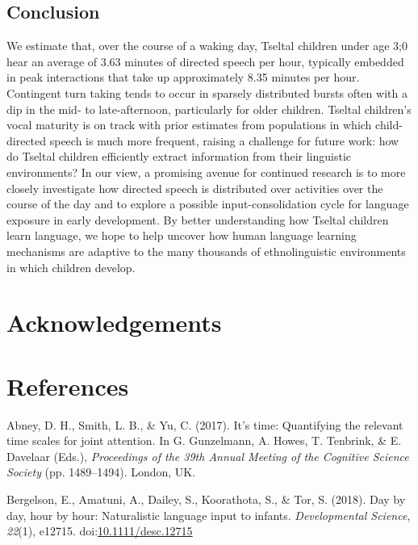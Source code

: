 \documentclass[floatsintext,man]{apa6}
\theoremstyle{definition}
\theoremstyle{definition}
\theoremstyle{definition}
\theoremstyle{remark}
\begin{document}
\subsection{Conclusion}\label{disc-conclusion}

We estimate that, over the course of a waking day, Tseltal children
under age 3;0 hear an average of 3.63 minutes of directed speech per
hour, typically embedded in peak interactions that take up approximately
8.35 minutes per hour. Contingent turn taking tends to occur in sparsely
distributed bursts often with a dip in the mid- to late-afternoon,
particularly for older children. Tseltal children's vocal maturity is on
track with prior estimates from populations in which child-directed
speech is much more frequent, raising a challenge for future work: how
do Tseltal children efficiently extract information from their
linguistic environments? In our view, a promising avenue for continued
research is to more closely investigate how directed speech is
distributed over activities over the course of the day and to explore a
possible input-consolidation cycle for language exposure in early
development. By better understanding how Tseltal children learn
language, we hope to help uncover how human language learning mechanisms
are adaptive to the many thousands of ethnolinguistic environments in
which children develop.

\section{Acknowledgements}\label{acknowledgements}

\newpage

\section{References}\label{refs}

\begingroup
\setlength{\parindent}{-0.5in} \setlength{\leftskip}{0.5in}

\hypertarget{refs}{}
\hypertarget{ref-abney2017time}{}
Abney, D. H., Smith, L. B., \& Yu, C. (2017). It's time: Quantifying the
relevant time scales for joint attention. In G. Gunzelmann, A. Howes, T.
Tenbrink, \& E. Davelaar (Eds.), \emph{Proceedings of the 39th Annual
Meeting of the Cognitive Science Society} (pp. 1489--1494). London, UK.

\hypertarget{ref-bergelson2018day}{}
Bergelson, E., Amatuni, A., Dailey, S., Koorathota, S., \& Tor, S.
(2018). Day by day, hour by hour: Naturalistic language input to
infants. \emph{Developmental Science}, \emph{22}(1), e12715.
doi:\href{https://doi.org/10.1111/desc.12715}{10.1111/desc.12715}
\end{document}
